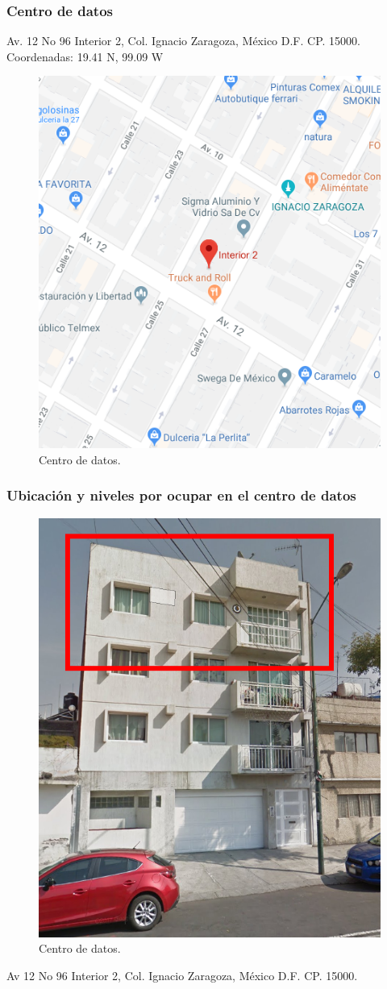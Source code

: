 \documentclass[12pt,letterpaper]{article}
\begin{document}
\newpage
\subsubsection{Centro de datos}
Av. 12 No 96 Interior 2, Col. Ignacio Zaragoza, México D.F. CP. 15000.
\\ Coordenadas: 19.41 N, 99.09 W
\begin{figure}[ht]
    \centering
    \includegraphics[width=.8\textwidth]{imagenes/centrodatos.png}
    \caption{Centro de datos.}
\end{figure}

\newpage
\subsubsection{Ubicación y niveles por ocupar en el centro de datos}
\begin{figure}[ht]
    \centering
    \includegraphics[width=.7\textwidth]{imagenes/cdedificio.png}
    \caption{Centro de datos.}
\end{figure}
Av 12 No 96 Interior 2, Col. Ignacio Zaragoza, México D.F. CP. 15000.
\end{document}
